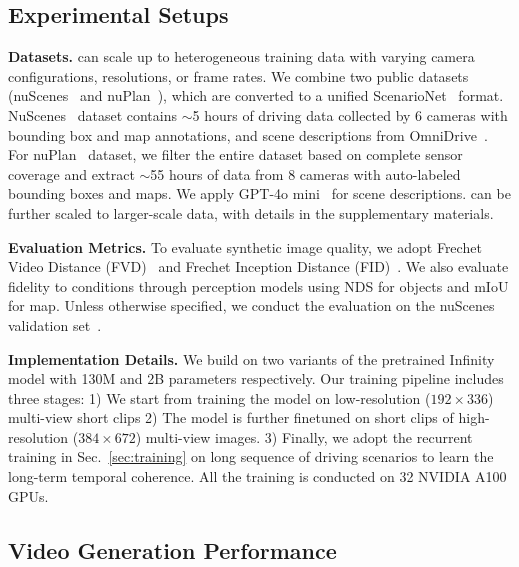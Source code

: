 \subsection{Experimental Setups}
\label{sec:setups}

\noindent\textbf{Datasets.} \ourmethod{} can scale up to heterogeneous training data with varying camera configurations, resolutions, or frame rates. We combine two public datasets (nuScenes~\cite{caesar2020nuscenes} and nuPlan~\cite{caesar2022nuplanclosedloopmlbasedplanning}), which are converted to a unified ScenarioNet~\cite{li2023scenarionet} format. NuScenes~\cite{caesar2020nuscenes} dataset contains $\sim$5 hours of driving data collected by 6 cameras with bounding box and map annotations, and scene descriptions from OmniDrive~\cite{wang2025omnidrive}. For nuPlan~\cite{caesar2022nuplanclosedloopmlbasedplanning} dataset, we filter the entire dataset based on complete sensor coverage and extract $\sim$55 hours of data from 8 cameras with auto-labeled bounding boxes and maps. We apply GPT-4o mini~\cite{team2024gpt} for scene descriptions. \ourmethod{} can be further scaled to larger-scale data, with details in the supplementary materials.

\noindent\textbf{Evaluation Metrics.}  To evaluate synthetic image quality, we adopt Frechet Video Distance (FVD)~\cite{unterthiner2018towards} and Frechet Inception Distance (FID)~\cite{heusel2017gans}. We also evaluate fidelity to conditions through perception models using NDS for objects and mIoU for map. Unless otherwise specified, we conduct the evaluation on the nuScenes validation set~\cite{caesar2020nuscenes}.

\noindent\textbf{Implementation Details.} We build \ourmethod{} on two variants of the pretrained Infinity~\cite{han2024infinity} model with 130M and 2B parameters respectively. Our training pipeline includes three stages: 1) We start from training the model on low-resolution ($192\times336$) multi-view short clips 2) The model is further finetuned on short clips of high-resolution ($384\times672$) multi-view images. 3) Finally, we adopt the recurrent training in Sec.~\ref{sec:training} on long sequence of driving scenarios to learn the long-term temporal coherence. All the training is conducted on 32 NVIDIA A100 GPUs.

\subsection{Video Generation Performance}

